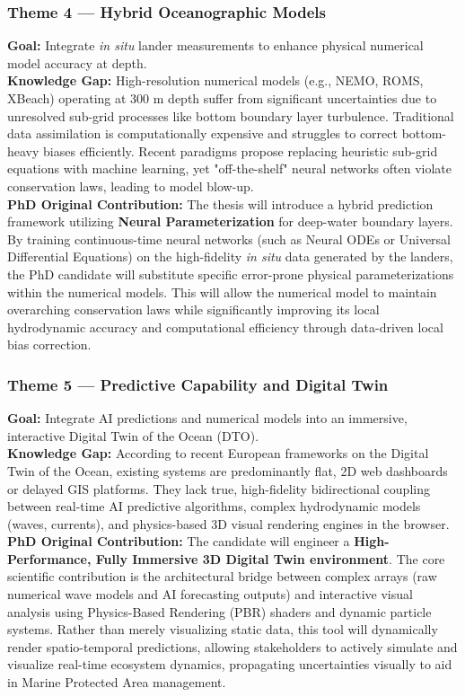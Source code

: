 \documentclass[12pt,a4paper]{article}
\begin{document}
\subsubsection{Theme 4 — Hybrid Oceanographic Models}
\textbf{Goal:} Integrate \textit{in situ} lander measurements to enhance physical numerical model accuracy at depth.\\
\textbf{Knowledge Gap:} High-resolution numerical models (e.g., NEMO, ROMS, XBeach) operating at 300 m depth suffer from significant uncertainties due to unresolved sub-grid processes like bottom boundary layer turbulence. Traditional data assimilation is computationally expensive and struggles to correct bottom-heavy biases efficiently. Recent paradigms propose replacing heuristic sub-grid equations with machine learning, yet "off-the-shelf" neural networks often violate conservation laws, leading to model blow-up.\\
\textbf{PhD Original Contribution:} The thesis will introduce a hybrid prediction framework utilizing \textbf{Neural Parameterization} for deep-water boundary layers. By training continuous-time neural networks (such as Neural ODEs or Universal Differential Equations) on the high-fidelity \textit{in situ} data generated by the landers, the PhD candidate will substitute specific error-prone physical parameterizations within the numerical models. This will allow the numerical model to maintain overarching conservation laws while significantly improving its local hydrodynamic accuracy and computational efficiency through data-driven local bias correction.

\subsubsection{Theme 5 — Predictive Capability and Digital Twin}
\textbf{Goal:} Integrate AI predictions and numerical models into an immersive, interactive Digital Twin of the Ocean (DTO).\\
\textbf{Knowledge Gap:} According to recent European frameworks on the Digital Twin of the Ocean, existing systems are predominantly flat, 2D web dashboards or delayed GIS platforms. They lack true, high-fidelity bidirectional coupling between real-time AI predictive algorithms, complex hydrodynamic models (waves, currents), and physics-based 3D visual rendering engines in the browser.\\
\textbf{PhD Original Contribution:} The candidate will engineer a \textbf{High-Performance, Fully Immersive 3D Digital Twin environment}. The core scientific contribution is the architectural bridge between complex arrays (raw numerical wave models and AI forecasting outputs) and interactive visual analysis using Physics-Based Rendering (PBR) shaders and dynamic particle systems. Rather than merely visualizing static data, this tool will dynamically render spatio-temporal predictions, allowing stakeholders to actively simulate and visualize real-time ecosystem dynamics, propagating uncertainties visually to aid in Marine Protected Area management.
\end{document}
